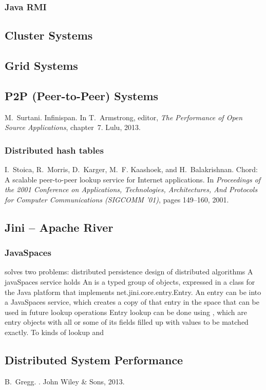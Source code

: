 \documentclass{myproc}
\begin{document}
\subsubsection{Java RMI}
\subsection{Cluster Systems}
\subsection{Grid Systems}
\subsection{P2P (Peer-to-Peer) Systems}
\bit
\w M.~Surtani.
\newblock Infinispan.
\newblock In T.~Armstrong, editor, {\em The Performance of Open Source
  Applications}, chapter~7. Lulu, 2013.
\eit
\subsubsection{Distributed hash tables}
\bit
\w I.~Stoica, R.~Morris, D.~Karger, M.~F. Kaashoek, and H.~Balakrishnan.
\newblock Chord: A scalable peer-to-peer lookup service for Internet
  applications.
\newblock In {\em Proceedings of the 2001 Conference on Applications,
  Technologies, Architectures, And Protocols for Computer Communications
  (SIGCOMM '01)}, pages 149--160, 2001.
\eit

\subsection{Jini -- Apache River}
\subsubsection{JavaSpaces}
\bit
\w solves two problems:
   \bit
   \w distributed persistence
   \w design of distributed algorithms
   \eit
\w A javaSpaces service holds 
\w An  is a typed group of objects, expressed in a class for the
Java platform that implements net.jini.core.entry.Entry. 
\w An entry can be  into a JavaSpaces service, which creates a
copy of that entry in the space that can be used in future lookup operations
\w Entry lookup can be done using , which are entry objects with
all or some of its fields filled up with values to be matched exactly.
\w To kinds of lookup  and 
\eit

\subsection{\textcolor{red2}{\bf{}Distributed System Performance}}
\bit
\w \textcolor{blue2}{B.~Gregg.
.
\newblock John Wiley \& Sons, 2013.}
\eit
\end{document}
